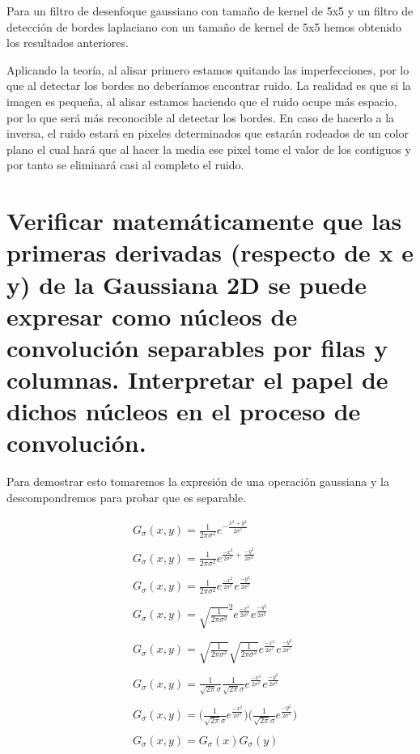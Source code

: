 \documentclass{article}
\begin{document}
\newpage
Para un filtro de desenfoque gaussiano con tamaño de kernel de 5x5 y un filtro de detección de bordes laplaciano con un tamaño de kernel de 5x5 hemos obtenido los resultados anteriores.

Aplicando la teoría, al alisar primero estamos quitando las imperfecciones, por lo que al detectar los bordes no deberíamos encontrar ruido. La realidad es que si la imagen es pequeña, al alisar estamos haciendo que el ruido ocupe más espacio, por lo que será más reconocible al detectar los bordes. En caso de hacerlo a la inversa, el ruido estará en pixeles determinados que estarán rodeados de un color plano el cual hará que al hacer la media ese pixel tome el valor de los contiguos y por tanto se eliminará casi al completo el ruido.

\newpage
\section{Verificar matemáticamente que las primeras derivadas (respecto de x e y) de la Gaussiana 2D se puede expresar como núcleos de convolución separables por filas y columnas. Interpretar el papel de dichos núcleos en el proceso de convolución.}

Para demostrar esto tomaremos la expresión de una operación gaussiana y la descompondremos para probar que es separable.


\begin{align*}
& G_{\sigma}(x,y) = \frac{1}{2\pi\sigma^2} e^{-\frac{x^2+y^2}{2\sigma^2}}\\
\\
& G_{\sigma}(x,y) = \frac{1}{2\pi\sigma^2}e^{\frac{-x^2}{2\sigma^2}+{\frac{-y^2}{2\sigma^2}}}\\
\\
& G_{\sigma}(x,y) = \frac{1}{2\pi\sigma^2}e^{\frac{-x^2}{2\sigma^2}}e^{\frac{-y^2}{2\sigma^2}}\\
\\
& G_{\sigma}(x,y) = \sqrt{\frac{1}{2\pi\sigma^2}}^2e^{\frac{-x^2}{2\sigma^2}}e^{\frac{-y^2}{2\sigma^2}}\\
\\
& G_{\sigma}(x,y) = \sqrt{\frac{1}{2\pi\sigma^2}}\sqrt{\frac{1}{2\pi\sigma^2}}e^{\frac{-x^2}{2\sigma^2}}e^{\frac{-y^2}{2\sigma^2}}\\
\\
& G_{\sigma}(x,y) = \frac{1}{\sqrt{2\pi}\sigma}\frac{1}{\sqrt{2\pi}\sigma}e^{\frac{-x^2}{2\sigma^2}}e^{\frac{-y^2}{2\sigma^2}}\\
\\
& G_{\sigma}(x,y) =\Bigg( \frac{1}{\sqrt{2\pi}\sigma}e^{\frac{-x^2}{2\sigma^2}}\Bigg) \Bigg(\frac{1}{\sqrt{2\pi}\sigma}e^{\frac{-y^2}{2\sigma^2}}\Bigg)\\
\\
& G_{\sigma}(x,y) = G_{\sigma}(x)G_{\sigma}(y)
\end{align*}
\end{document}
